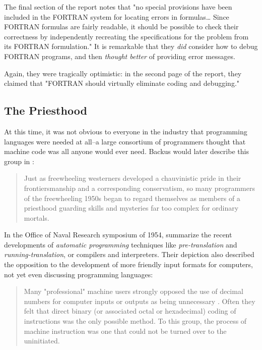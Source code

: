 The final section of the report notes that "no special provisions have been included
in the FORTRAN system for locating errors in formulas\dots
Since FORTRAN formulas are fairly readable, it should be possible to
check their correctness by independently recreating the specifications for
the problem from its FORTRAN formulation." \cite[C. DEBUGGING]{IBM_1954_FORTRAN_Specifications}
It is remarkable that they \textit{did} consider how to debug FORTRAN programs,
and then \textit{thought better} of providing error messages.

Again, they were tragically optimistic: in the second page of the report,
they claimed that "FORTRAN should virtually eliminate coding and debugging."

\subsection{The Priesthood}
\label{sec:backus_priesthood}

At this time, it was not obvious to everyone in the industry that
programming languages were needed at all--a large consortium of programmers
thought that machine code was all anyone would ever need.
Backus would later describe this group in :

\begin{quotation}
	Just as freewheeling westerners developed a chauvinistic pride in their frontiersmanship
	and a corresponding conservatism, so many programmers of the freewheeling 1950s
	began to regard themselves as members of a priesthood guarding skills and
	mysteries far too complex for ordinary mortals.
	\cite{Backus_1980_Programming_in_America_in_1950s}
\end{quotation}

In the Office of Naval Research symposium of 1954,
\citeauthor{brown_carr_automatic_onr_symposium_1954} summarize the recent developments
of \textit{automatic programming} techniques like \textit{pre-translation} and \textit{running-translation},
or compilers and interpreters.
Their depiction also described the opposition to the development of more friendly
input formats for computers, not yet even discussing programming languages:

\begin{quotation}
	Many "professional" machine users strongly opposed the use of decimal
	numbers for computer inputs or outputs as being unnecessary . Often they felt
	that direct binary (or associated octal or hexadecimal) coding of instructions
	was the only possible method. To this group, the process of machine instruction
	was one that could not be turned over to the uninitiated.
	\cite{brown_carr_automatic_onr_symposium_1954}
\end{quotation}

